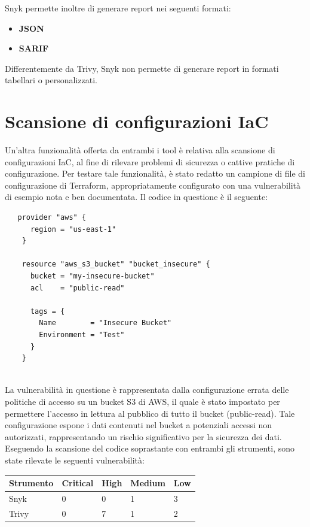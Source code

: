 Snyk permette inoltre di generare report nei seguenti formati:
\begin{itemize}
   \item\textbf{JSON}
   \item\textbf{SARIF}
\end{itemize}

Differentemente da Trivy, Snyk non permette di generare report in formati tabellari o personalizzati.

\section{Scansione di configurazioni IaC}
Un'altra funzionalità offerta da entrambi i tool è relativa alla scansione di configurazioni IaC, al fine di rilevare problemi di sicurezza o cattive pratiche di configurazione. Per testare tale funzionalità, è stato redatto un campione di file di configurazione di Terraform, appropriatamente configurato con una vulnerabilità di esempio nota e ben documentata. Il codice in questione è il seguente:
\begin{lstlisting}
   provider "aws" {
      region = "us-east-1"
    }
    
    resource "aws_s3_bucket" "bucket_insecure" {
      bucket = "my-insecure-bucket"
      acl    = "public-read"
    
      tags = {
        Name        = "Insecure Bucket"
        Environment = "Test"
      }
    }
    
\end{lstlisting}


La vulnerabilità in questione è rappresentata dalla configurazione errata delle politiche di accesso su un bucket S3 di AWS, il quale è stato impostato per permettere l'accesso in lettura al pubblico di tutto il bucket (public-read). Tale configurazione espone i dati contenuti nel bucket a potenziali accessi non autorizzati, rappresentando un rischio significativo per la sicurezza dei dati.
Eseguendo la scansione del codice soprastante con entrambi gli strumenti, sono state rilevate le seguenti vulnerabilità:

\begin{center}
   \begin{tabularx}{0.8\textwidth}{|X|X|X|X|X|}
      \hline
      \textbf{Strumento} & \textbf{Critical} & \textbf{High} & \textbf{Medium} & \textbf{Low} \\
      \hline
      Snyk               & 0                 & 0             & 1               & 3            \\
      \hline
      Trivy              & 0                 & 7             & 1               & 2            \\
      \hline
   \end{tabularx}
\end{center}


